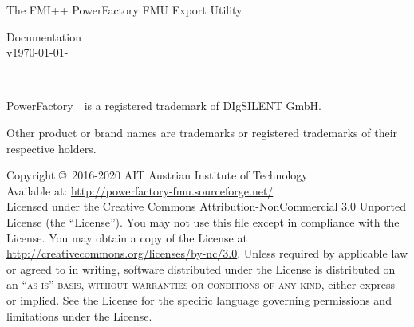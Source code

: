\documentclass[11pt,fleqn,oneside,openany]{book} %
\newcommand{\versionsep}{-}
\newcommand{\fmipp}{FMI++\xspace}
\newcommand{\pf}{PowerFactory\xspace}
\begin{document}

\begingroup
\thispagestyle{empty}
\centering
\vspace*{9.35cm}
\par\normalfont\fontsize{29}{30}\sffamily\selectfont
The \fmipp \pf FMU Export Utility\par %
\vspace*{0.5cm}
{\huge Documentation}\\[5pt]
{\normalsize v\yyyymmdddate\today\versionsep\currenttime}\par %
\endgroup


\newpage
~\vfill
\thispagestyle{empty}

\noindent \pf~\textregistered~is a registered trademark of DIgSILENT GmbH.

\noindent Other product or brand names are trademarks or registered trademarks of their respective holders.

\vspace*{2cm}

\noindent Copyright \copyright\ 2016-2020 AIT Austrian Institute of Technology\\ %


\noindent Available at: \url{http://powerfactory-fmu.sourceforge.net/}\\ %

\noindent Licensed under the Creative Commons Attribution-NonCommercial 3.0 Unported License (the ``License''). You may not use this file except in compliance with the License. You may obtain a copy of the License at \url{http://creativecommons.org/licenses/by-nc/3.0}. Unless required by applicable law or agreed to in writing, software distributed under the License is distributed on an \textsc{``as is'' basis, without warranties or conditions of any kind}, either express or implied. See the License for the specific language governing permissions and limitations under the License.\\ %
\end{document}
